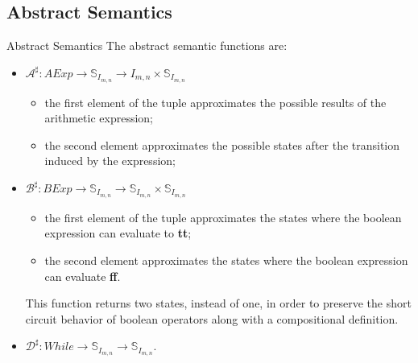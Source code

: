 \subsection{Abstract Semantics}

\begin{frame}{Abstract Semantics}
    The abstract semantic functions are:
    \begin{itemize}
        \item $\mathcal{A}^\sharp : AExp \to \mathbb{S}_{I_{m,n}} \to I_{m,n} \times \mathbb{S}_{I_{m,n}}$
        \begin{itemize}
            \item the first element of the tuple approximates the possible results of the arithmetic expression;
            \item the second element approximates the possible states after the transition induced by the expression;
        \end{itemize}
        \item $\mathcal{B}^\sharp : BExp \to \mathbb{S}_{I_{m,n}} \to \mathbb{S}_{I_{m,n}} \times \mathbb{S}_{I_{m,n}}$
        \begin{itemize}
            \item the first element of the tuple approximates the states where the boolean expression can evaluate to \textbf{tt};
            \item the second element approximates the states where the boolean expression can evaluate \textbf{ff}.
        \end{itemize}
        This function returns two states, instead of one, in order to preserve the short circuit behavior of boolean operators along with a compositional definition.
        \item $\mathcal{D}^\sharp : While \to \mathbb{S}_{I_{m,n}} \to\mathbb{S}_{I_{m,n}}$.
    \end{itemize}
\end{frame}

